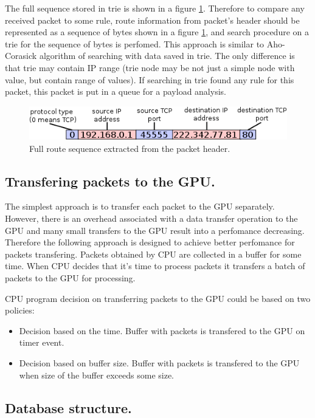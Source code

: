 \documentclass[thesis=M,english]{FITthesis}[2011/07/15]
\begin{document}
The full sequence stored in trie is shown in a figure \ref{fig:route_sequence}. Therefore to compare any received packet to some rule, route information from packet's header should be represented as a sequence of bytes shown in a figure \ref{fig:route_sequence}, and search procedure on a trie for the sequence of bytes is perfomed. This approach is similar to Aho-Corasick algorithm of searching with data saved in trie. The only difference is that trie may contain IP range (trie node may be not just a simple node with value, but contain range of values). If searching in trie found any rule for this packet, this packet is put in a queue for a payload analysis. 

\begin{figure}[h]
\centering
\includegraphics[scale=0.6]{images/route_sequence.png}
\caption{Full route sequence extracted from the packet header.}
\label{fig:route_sequence}
\end{figure}

\subsection*{Transfering packets to the GPU.}
The simplest approach is to transfer each packet to the GPU separately. However, there is an overhead associated with a data transfer operation to the GPU and many small transfers to the GPU result into a perfomance decreasing. Therefore the following approach is designed to achieve better perfomance for packets transfering. Packets obtained by CPU are collected in a buffer for some time. When CPU decides that it's time to process packets it transfers a batch of packets to the GPU for processing. 

CPU program decision on transferring packets to the GPU could be based on two policies:
\begin{itemize}
\item Decision based on the time. Buffer with packets is transfered to the GPU on timer event.
\item Decision based on buffer size. Buffer with packets is transfered to the GPU when size of the buffer exceeds some size.
\end{itemize}

\subsection*{Database structure.}
\end{document}
